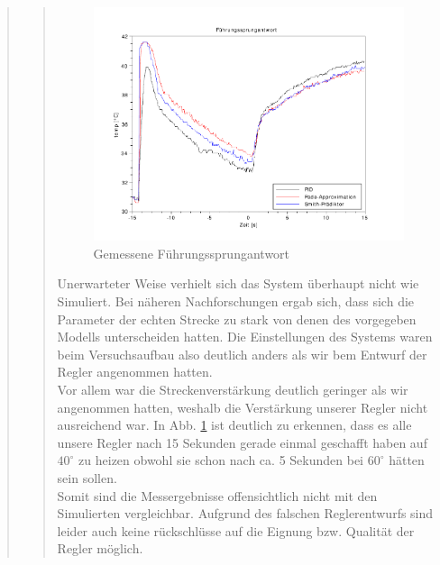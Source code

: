 \begin{quote}
\begin{quote}
        \begin{figure}[H]
            \centering
            \includegraphics[scale=1, trim = 1cm 0.5cm 1cm 1cm, clip]{Bilder/5}
            \caption{Gemessene Führungssprungantwort}
            \label{fig:5}
        \end{figure}
        \vspace{1em}
        
        Unerwarteter Weise verhielt sich das System überhaupt nicht wie Simuliert. Bei näheren Nachforschungen ergab
        sich, dass sich die Parameter der echten Strecke zu stark von denen des vorgegeben Modells unterscheiden hatten. Die
        Einstellungen des Systems waren beim Versuchsaufbau also deutlich anders als wir bem Entwurf der Regler
        angenommen hatten.\\
        Vor allem war die Streckenverstärkung deutlich geringer als wir angenommen hatten, weshalb die Verstärkung
        unserer Regler nicht ausreichend war. In Abb. \ref{fig:5} ist deutlich zu erkennen, dass es alle
        unsere Regler nach 15 Sekunden gerade einmal geschafft haben auf $40^{\circ}$ zu heizen obwohl sie schon nach
        ca. 5 Sekunden bei $60^{\circ}$ hätten sein sollen.\\
        Somit sind die Messergebnisse offensichtlich nicht mit den Simulierten vergleichbar. Aufgrund des falschen
        Reglerentwurfs sind leider auch keine rückschlüsse auf die Eignung bzw. Qualität der Regler möglich.
        
        


    \end{quote}
    
    
    
    
\end{quote}

